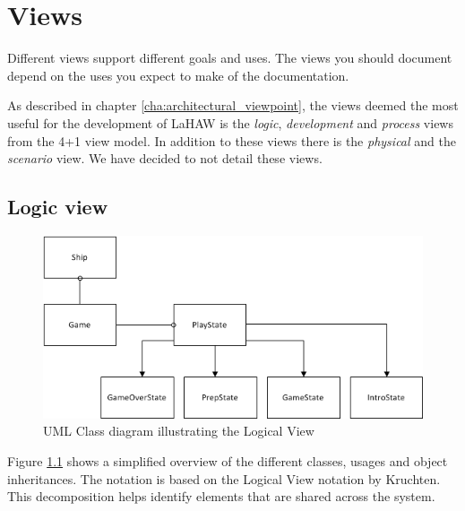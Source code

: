 \chapter{Views}


Different views support different goals and uses.
The views you should document depend on the uses you expect to make of the documentation.



As described in chapter \ref{cha:architectural_viewpoint}, the views deemed the most useful for the development of LaHAW is the \emph{logic}, \emph{development} and \emph{process} views from the 4+1 view model.
In addition to these views there is the \emph{physical} and the \emph{scenario} view. We have decided to not detail these views.



\section{Logic view}


\begin{figure}[ht]
	\centering
    \includegraphics[width=\textwidth]{LogicalView.png}
    \caption{UML Class diagram illustrating the Logical View}
    \label{fig:LogicalView}
\end{figure}

Figure \ref{fig:LogicalView} shows a simplified overview of the different classes, usages and object inheritances. The notation is based on the Logical View notation by Kruchten\cite{kruchten}. This decomposition helps identify elements that are shared across the system.


